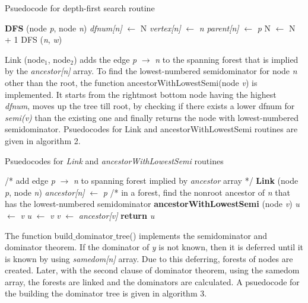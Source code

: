 \documentclass[10pt, oneside, a4paper]{article}
\begin{document}
\begin{algorithm}
\caption{Psuedocode for depth-first search routine}
\label{alg1}
\begin{algorithmic}[1]
\STATE \textbf{DFS} (node \emph{p}, node \emph{n})
\STATE \emph{dfnum[n]} $\leftarrow$ N
\STATE \emph{vertex[n]} $\leftarrow$ \emph{n}
\STATE \emph{parent[n]} $\leftarrow$ \emph{p}
\STATE N $\leftarrow$ N + 1
\STATE DFS (\emph{n}, \emph{w})
\ENDFOR
\ENDIF
\end{algorithmic}
\end{algorithm}

Link (node$_1$, node$_2$) adds the edge \emph{p} $\rightarrow$ \emph{n} to the spanning forest that is implied by the \emph{ancestor[n]} array.  To find the lowest-numbered semidominator for node \emph{n} other than the root, the function ancestorWithLowestSemi(node \emph{v}) is implemented.  It starts from the rightmost bottom node having the highest \emph{dfnum}, moves up the tree till root, by checking if there exists a lower dfnum for \emph{semi(v)} than the existing one and finally returns the node with lowest-numbered semidominator.  Psuedocodes for Link and ancestorWithLowestSemi routines are given in algorithm 2.

\begin{algorithm}
\caption{Psuedocodes for \emph{Link} and \emph{ancestorWithLowestSemi} routines}
\label{alg2}
\begin{algorithmic}[1]
\STATE /* add edge \emph{p} $\rightarrow$ \emph{n} to spanning forest implied by \emph{ancestor} array */
\STATE \textbf{Link} (node \emph{p}, node \emph{n})
\STATE \emph{ancestor[n]} $\leftarrow$ \emph{p}
\STATE
\STATE /* in a forest, find the nonroot ancestor of \emph{n} that has the lowest-numbered semidominator
\STATE \textbf{ancestorWithLowestSemi} (node \emph{v})
\STATE \emph{u} $\leftarrow$ \emph{v}
\STATE \emph{u} $\leftarrow$ \emph{v}
\ENDIF
\STATE \emph{v} $\leftarrow$ \emph{ancestor[v]}
\ENDWHILE
\STATE \textbf{return} \emph{u}
\end{algorithmic}
\end{algorithm}

The function build$\_$dominator$\_$tree() implements the semidominator and dominator theorem.  If the dominator of \emph{y} is not known, then it is deferred until it is known by using \emph{samedom[n]} array.  Due to this deferring, forests of nodes are created.  Later, with the second clause of dominator theorem, using the samedom array, the forests are linked and the dominators are calculated.  A psuedocode for the building the dominator tree is given in algorithm 3.
\end{document}
